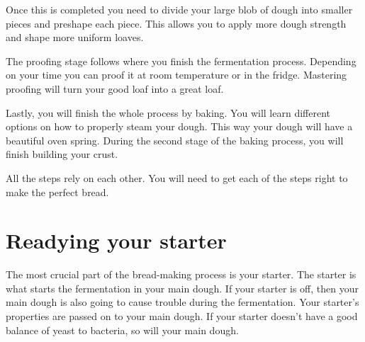 Once this is completed you need to divide your large blob of
dough into smaller pieces and preshape each piece. This allows
you to apply more dough strength and shape more uniform loaves.

The proofing stage follows where you finish the fermentation process.
Depending on your time you can proof it at room temperature or in the fridge.
Mastering proofing will turn your good loaf into a great loaf.

Lastly, you will finish the whole process by baking. You will learn different
options on how to properly steam your dough. This way your
dough will have a beautiful oven spring. During the second
stage of the baking process, you will finish building your crust.

All the steps rely on each other. You will need to get each of
the steps right to make the perfect bread.

\section{Readying your starter}
\label{section:readying-starter}

The most crucial part of the bread-making process is your starter.
The starter is what starts the fermentation in your main dough.
If your starter is off, then your main dough is also going
to cause trouble during the fermentation. Your starter's
properties are passed on to your main dough. If your starter
doesn't have a good balance of yeast to bacteria, so will your
main dough.

